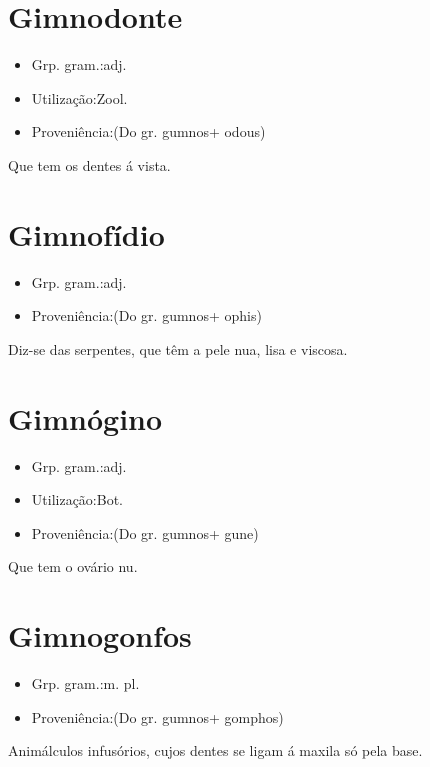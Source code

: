 \section{Gimnodonte}
\begin{itemize}
\item {Grp. gram.:adj.}
\end{itemize}
\begin{itemize}
\item {Utilização:Zool.}
\end{itemize}
\begin{itemize}
\item {Proveniência:(Do gr. \textunderscore gumnos\textunderscore  + \textunderscore odous\textunderscore )}
\end{itemize}
Que tem os dentes á vista.
\section{Gimnofídio}
\begin{itemize}
\item {Grp. gram.:adj.}
\end{itemize}
\begin{itemize}
\item {Proveniência:(Do gr. \textunderscore gumnos\textunderscore  + \textunderscore ophis\textunderscore )}
\end{itemize}
Diz-se das serpentes, que têm a pele nua, lisa e viscosa.
\section{Gimnógino}
\begin{itemize}
\item {Grp. gram.:adj.}
\end{itemize}
\begin{itemize}
\item {Utilização:Bot.}
\end{itemize}
\begin{itemize}
\item {Proveniência:(Do gr. \textunderscore gumnos\textunderscore  + \textunderscore gune\textunderscore )}
\end{itemize}
Que tem o ovário nu.
\section{Gimnogonfos}
\begin{itemize}
\item {Grp. gram.:m. pl.}
\end{itemize}
\begin{itemize}
\item {Proveniência:(Do gr. \textunderscore gumnos\textunderscore  + \textunderscore gomphos\textunderscore )}
\end{itemize}
Animálculos infusórios, cujos dentes se ligam á maxila só pela base.
